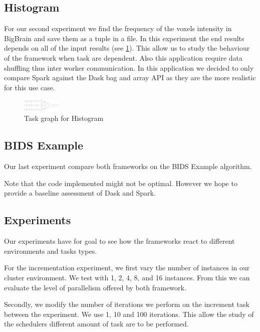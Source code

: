 \documentclass[11pt,a4paper]{article}
\begin{document}
\subsection{Histogram}
For our second experiment we find the frequency of the voxels intensity in BigBrain and save them as a tuple in a file. In this experiment the end results depends on all of the input results (see \ref{fig:tg-histo}). This allow us to study the behaviour of the framework when task are dependent. Also this application require data shuffling thus inter worker communication. In this application we decided to only compare Spark against the Dask bag and array API as they are the more realistic for this use case.

\begin{figure}[ht]
    \centering
    \includegraphics[width=0.16\textwidth, angle=-90]{images/histogram-task-graph.png}
    \caption{Task graph for Histogram}
    \label{fig:tg-histo}
\end{figure}

\subsection{BIDS Example}
Our last experiment compare both frameworks on the BIDS Example algorithm.

Note that the code implemented might not be optimal. However we hope to provide a baseline assessment of Dask and Spark.

\subsection{Experiments}
Our experiments have for goal to see how the frameworks react to different environments and tasks types.

For the incrementation experiment, we
first vary the number of instances in our cluster environment. We test with 1, 2, 4, 8, and 16 instances. From this we can evaluate the level of parallelism offered by both framework.

Secondly, we modify the number of iterations we perform on the increment task between the experiment. We use 1, 10 and 100 iterations. This allow the study of the schedulers different amount of task are to be performed.
\end{document}
